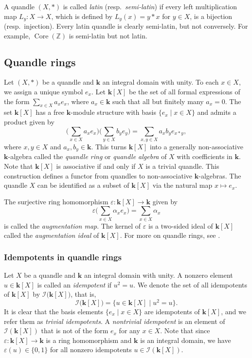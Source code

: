 \documentclass[12pt]{amsart}
\theoremstyle{definition}
\theoremstyle{remark}
\newcommand{\I}{\mathcal{I}}
\renewcommand{\epsilon}{\varepsilon}
\def\Core{\operatorname{Core}}
\begin{document}
A quandle $(X, *)$ is called {\it latin} (resp.\ \emph{semi-latin}) if every left multiplication map $L_y\colon X \to X$, which is defined by $L_y(x)=y*x$ for $y \in X$, is a bijection (resp.\ injection).  Every latin quandle is clearly semi-latin, but not conversely. For example, $\Core(\mathbb{Z})$ is semi-latin but not latin.  

\subsection{Quandle rings}
Let $(X, *)$ be a quandle and $\mathbf{k}$ an integral domain with unity. To each $x \in X$, we assign a unique symbol $e_x$. 
Let $\mathbf{k}[X]$ be the set of all formal expressions of the form $\sum_{x \in X }  a_x e_x$, where $a_x \in \mathbf{k}$ such that all but finitely many $a_x=0$.  The set $\mathbf{k}[X]$ has a free $\mathbf{k}$-module structure with basis $\{e_x \mid x \in X \}$ and admits a product given by 
 $$ \Big( \sum_{x \in X }  a_x e_x \Big) \Big( \sum_{ y \in X }  b_y e_y \Big)
 =   \sum_{x, y \in X } a_x b_y e_{x * y},$$
where $x, y \in X$ and $a_x, b_y \in \mathbf{k}$. This turns $\mathbf{k}[X]$ into a generally non-associative $\mathbf k$-algebra called the {\it quandle ring} or \emph{quandle algebra} of $X$ with coefficients in $\mathbf{k}$. Note that $\mathbf k[X]$ is associative if and only if $X$ is a trivial quandle. This construction defines a functor from quandles to non-associative $\mathbf k$-algebras. The quandle $X$ can be identified as a subset of $\mathbf{k}[X]$ via the natural map $x \mapsto e_x$. 
\par
The surjective ring homomorphism $\varepsilon\colon \mathbf{k}[X] \rightarrow \mathbf{k}$ given by $$\varepsilon \Big(\sum_{x \in X }  \alpha_x e_x \Big)=\sum_{x \in X }  \alpha_x$$
is called the {\it augmentation map}. The kernel of $\varepsilon $ is a two-sided ideal of $\mathbf{k}[X]$ called the {\it augmentation ideal} of $\mathbf{k}[X]$. 
For more on quandle rings, see \cite{BES}. 

\subsubsection{Idempotents in quandle rings}
Let $X$ be a quandle and $\mathbf{k}$ an integral domain with unity.  A nonzero element $u \in \mathbf{k}[X]$ is called an {\it idempotent} if $u^2=u$. We denote the set of all idempotents of $\mathbf{k}[X]$ by $\mathcal{I}\big(\mathbf{k}[X]\big)$, that is,
$$
\mathcal{I}\big(\mathbf{k}[X] \big)=\big\{ u  \in \mathbf{k}[X]\; | \; u^2=u\big \}.
$$
It is clear that the basis elements $\{e_x \mid x \in X\}$ are idempotents of $\mathbf{k}[X]$, and we refer them as {\it trivial idempotents}.  A \emph{nontrivial idempotent}  is an element of $\I(\mathbf{k}[X])$ that is not of the form $e_x$ for any $x \in X$. 
Note that since $\epsilon\colon\mathbf k[X]\to\mathbf k$ is a ring homomorphism and $\mathbf k$ is an integral domain, we have $\epsilon(u)\in\{0,1\}$ for all nonzero idempotents $u\in\mathcal I(\mathbf k[X])$.
\end{document}
